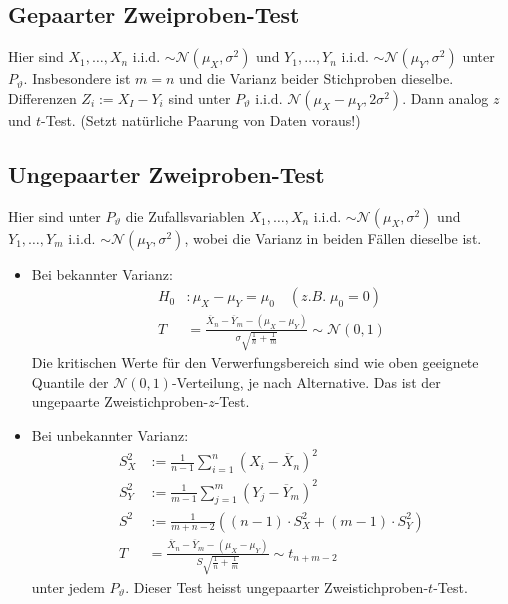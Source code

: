 \documentclass[8pt]{extarticle}
\newcommand{\vt}{\vartheta}
\newcommand{\Sn}{\sum_{i = 1}^n}
\newcommand{\zufallsvariablen}{X_1, \dots, X_n}
\newcommand{\Standardnormalverteilt}{\mathcal{N}(0, 1)}
\begin{document}
\begin{multicols*}{3}
  \subsection*{Gepaarter Zweiproben-Test}
  Hier sind $\zufallsvariablen$ i.i.d. $\sim \mathcal{N}(\mu_X, \sigma^2)$
  und $Y_1, \dots, Y_n$ i.i.d. $\sim \mathcal{N}(\mu_Y, \sigma^2)$ unter
  $P_\vt$. Insbesondere ist $m = n$ und die Varianz beider Stichproben
  dieselbe. Differenzen $Z_i := X_I - Y_i$ sind unter $P_\vt$ i.i.d.
  $\mathcal{N}(\mu_X - \mu_Y, 2 \sigma^2)$. Dann analog $z$ und $t$-Test.
  (Setzt natürliche Paarung von Daten voraus!)
  \subsection*{Ungepaarter Zweiproben-Test}
  Hier sind unter $P_\vt$ die Zufallsvariablen $\zufallsvariablen$
  i.i.d. $\sim \mathcal{N}(\mu_X, \sigma^2)$ und
  $Y_1, \dots, Y_m$ i.i.d. $\sim \mathcal{N}(\mu_Y, \sigma^2)$, wobei
  die Varianz in beiden Fällen dieselbe ist.
  \begin{itemize}
    \item Bei bekannter Varianz:
          \begin{align*}
            H_0 & : \mu_X - \mu_Y = \mu_0 \quad (z.B. \; \mu_0 = 0)                                                                                \\
            T   & = \frac{\overline{X}_n - \overline{Y}_m - (\mu_X - \mu_Y)}{\sigma \sqrt{\frac{1}{n} + \frac{1}{m}}} \sim \Standardnormalverteilt
          \end{align*}
          Die kritischen Werte für den Verwerfungsbereich sind wie oben
          geeignete Quantile der $\Standardnormalverteilt$-Verteilung, je nach
          Alternative. Das ist der ungepaarte Zweistichproben-$z$-Test.

    \item Bei unbekannter Varianz:
          \begin{align*}
            S_X^2 & := \frac{1}{n-1} \Sn (X_i - \overline{X}_n)^2                                                                 \\
            S_Y^2 & := \frac{1}{m-1} \sum_{j = 1}^m (Y_j - \overline{Y}_m)^2                                                      \\
            S^2   & := \frac{1}{m+n-2} \left( (n-1) \cdot S_X^2 + (m-1) \cdot S_Y^2 \right)                                       \\
            T     & = \frac{\overline{X}_n - \overline{Y}_m - (\mu_X - \mu_Y)}{S \sqrt{\frac{1}{n} + \frac{1}{m}}} \sim t_{n+m-2}
          \end{align*}
          unter jedem $P_\vt$. Dieser Test heisst ungepaarter Zweistichproben-$t$-Test.
  \end{itemize}

\end{multicols*}
\end{document}
